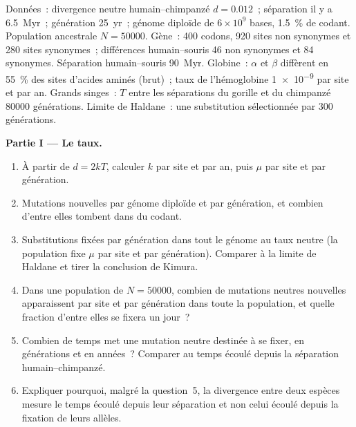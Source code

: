 \begin{problem}
\label{pb:b3:molecular-evolution:1}
Données~: divergence neutre humain--chimpanzé $d = 0.012$~; séparation
il y a \qty{6.5}{Myr}~; génération \qty{25}{yr}~; génome diploïde de
$6\times
10^{9}$ bases, \qty{1.5}{\%} de codant. Population ancestrale $N =
\num{50000}$. Gène~: 400 codons, 920 sites non synonymes et 280 sites
synonymes~; différences humain--souris 46 non synonymes et 84 synonymes.
Séparation humain--souris \qty{90}{Myr}. Globine~: $\alpha$ et $\beta$
diffèrent en \qty{55}{\%} des sites d'acides aminés (brut)~; taux de
l'hémoglobine \num{1e-9} par site et par an. Grands singes~: $T$ entre
les séparations du gorille et du chimpanzé \num{80000} générations.
Limite de Haldane~: une substitution sélectionnée par 300 générations.

\medskip
\noindent\textbf{Partie I --- Le taux.}
\begin{enumerate}
  \item À partir de $d = 2kT$, calculer $k$ par site et par an, puis
        $\mu$ par site et par génération.
  \item Mutations nouvelles par génome diploïde et par génération, et
        combien d'entre elles tombent dans du codant.
  \item Substitutions fixées par génération dans tout le génome au taux
        neutre (la population fixe $\mu$ par site et par génération).
        Comparer à la limite de Haldane et tirer la conclusion de Kimura.
  \item Dans une population de $N = \num{50000}$, combien de mutations
        neutres nouvelles apparaissent par site et par génération dans
        toute la population, et quelle fraction d'entre elles se fixera
        un jour~?
  \item Combien de temps met une mutation neutre destinée à se fixer, en
        générations et en années~? Comparer au temps écoulé depuis la
        séparation humain--chimpanzé.
  \item Expliquer pourquoi, malgré la question~5, la divergence entre
        deux espèces mesure le temps écoulé depuis leur séparation et non
        celui écoulé depuis la fixation de leurs allèles.
\end{enumerate}


\end{problem}
